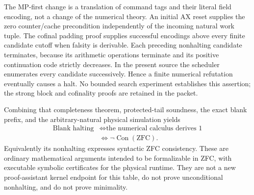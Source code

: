 The MP-first change is a translation of command tags and their literal field encoding, not a change of the numerical theory. An initial AX reset supplies the zero counter/cache precondition independently of the incoming natural work tuple. The cofinal padding proof supplies successful encodings above every finite candidate cutoff when falsity is derivable. Each preceding nonhalting candidate terminates, because its arithmetic operations terminate and its positive continuation code strictly decreases. In the present source the scheduler enumerates every candidate successively. Hence a finite numerical refutation eventually causes a halt. No bounded search experiment establishes this assertion; the strong block and cofinality proofs are retained in the packet.

Combining that completeness theorem, protected-tail soundness, the exact blank prefix, and the arbitrary-natural physical simulation yields
\[
\begin{aligned}
\text{Blank halting} &\Longleftrightarrow \text{the numerical calculus derives 1}\\
&\Longleftrightarrow \neg\operatorname{Con}(\mathrm{ZFC}).
\end{aligned}
\]
Equivalently its nonhalting expresses syntactic ZFC consistency. These are ordinary mathematical arguments intended to be formalizable in ZFC, with executable symbolic certificates for the physical runtime. They are not a new proof-assistant kernel endpoint for this table, do not prove unconditional nonhalting, and do not prove minimality.
